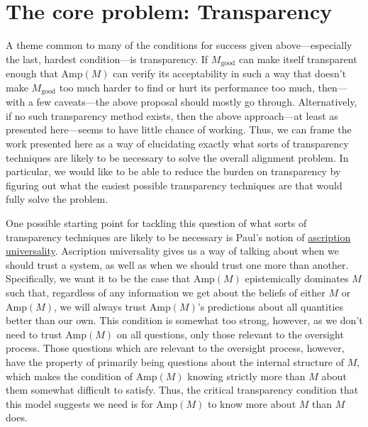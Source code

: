 \documentclass{amsart}
\begin{document}
\section{The core problem: Transparency}

A theme common to many of the conditions for success given above---especially the last, hardest condition---is transparency. If $M_\text{good}$ can make itself transparent enough that $\text{Amp}(M)$ can verify its acceptability in such a way that doesn't make $M_\text{good}$ too much harder to find or hurt its performance too much, then---with a few caveats---the above proposal should mostly go through. Alternatively, if no such transparency method exists, then the above approach---at least as presented here---seems to have little chance of working. Thus, we can frame the work presented here as a way of elucidating exactly what sorts of transparency techniques are likely to be necessary to solve the overall alignment problem. In particular, we would like to be able to reduce the burden on transparency by figuring out what the easiest possible transparency techniques are that would fully solve the problem.

One possible starting point for tackling this question of what sorts of transparency techniques are likely to be necessary is Paul's notion of \href{https://ai-alignment.com/towards-formalizing-universality-409ab893a456}{ascription universality}. Ascription universality gives us a way of talking about when we should trust a system, as well as when we should trust one more than another. Specifically, we want it to be the case that $\text{Amp}(M)$ epistemically dominates $M$ such that, regardless of any information we get about the beliefs of either $M$ or $\text{Amp}(M)$, we will always trust $\text{Amp}(M)$'s predictions about all quantities better than our own. This condition is somewhat too strong, however, as we don't need to trust $\text{Amp}(M)$ on all questions, only those relevant to the oversight process. Those questions which are relevant to the oversight process, however, have the property of primarily being questions about the internal structure of $M$, which makes the condition of $\text{Amp}(M)$ knowing strictly more than $M$ about them somewhat difficult to satisfy. Thus, the critical transparency condition that this model suggests we need is for $\text{Amp}(M)$ to know more about $M$ than $M$ does.
\end{document}
